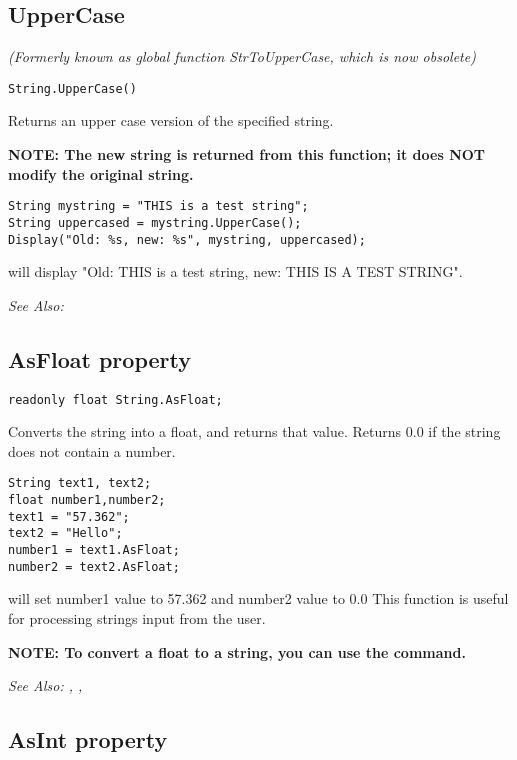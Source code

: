 \subsection{UpperCase}\label{String.UpperCase}%

\it{(Formerly known as global function StrToUpperCase, which is now obsolete)}

\begin{verbatim}
String.UpperCase()
\end{verbatim}
Returns an upper case version of the specified string.

\bf{NOTE:} The new string is returned from this function; it
does \bf{NOT} modify the original string.

\begin{verbatim}
String mystring = "THIS is a test string";
String uppercased = mystring.UpperCase();
Display("Old: %s, new: %s", mystring, uppercased);
\end{verbatim}
will display "Old: THIS is a test string, new: THIS IS A TEST STRING".

\it{See Also:} 


\subsection{AsFloat property}\label{String.AsFloat}%

\begin{verbatim}
readonly float String.AsFloat;
\end{verbatim}
Converts the string into a float, and returns that value. Returns
0.0 if the string does not contain a number.

\begin{verbatim}
String text1, text2;
float number1,number2;
text1 = "57.362";
text2 = "Hello";
number1 = text1.AsFloat;
number2 = text2.AsFloat;
\end{verbatim}
will set number1 value to 57.362 and number2 value to 0.0
This function is useful for processing strings input from the user.

\bf{NOTE:} To convert a float to a string, you can use the 
command.

\it{See Also:} ,
,


\subsection{AsInt property}\label{String.AsInt}%

